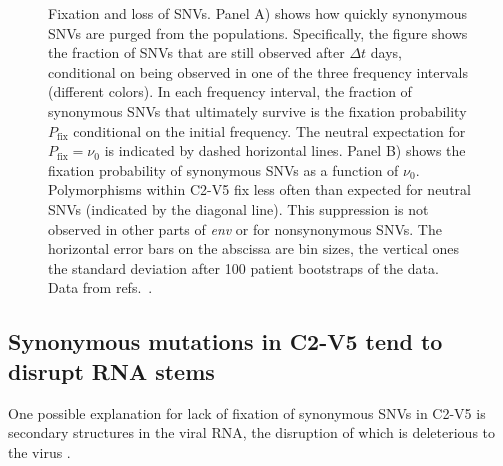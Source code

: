 \documentclass[rmp, twocolumn]{revtex4}
\newcommand{\pfix}{P_{\mathrm{fix}}}
\newcommand{\env}{\textit{env}}
\newcommand{\shankaregion}{C2-V5}
\begin{document}
\begin{figure}
\begin{center}
{\label{fig:fixp2}}
\caption{Fixation and loss of SNVs.
Panel A) shows how quickly synonymous SNVs are purged from the populations. 
Specifically, the figure shows the fraction of SNVs that are still observed
after $\Delta t$ days, conditional on being observed in one of the three frequency 
intervals (different colors). 
In each frequency interval, the fraction of synonymous
SNVs that ultimately survive is the fixation probability $\pfix$ conditional on the
initial frequency. The neutral expectation for $\pfix=\nu_0$ is indicated by 
dashed horizontal lines.
Panel B) shows the fixation probability of synonymous SNVs as a function of $\nu_0$. Polymorphisms within \shankaregion{} fix less
often than expected for neutral SNVs (indicated by the diagonal line).
This suppression is not observed in other parts of \env{} or for nonsynonymous
SNVs.
The horizontal error bars on the abscissa are bin sizes, the vertical ones the
standard deviation after 100 patient bootstraps of the data. Data from
refs.~\cite{shankarappa_consistent_1999,liu_selection_2006, bunnik_autologous_2008}.}
\label{fig:fixp}
\end{center}
\end{figure}

\subsection*{Synonymous mutations in \shankaregion{} tend to disrupt RNA stems}
One possible explanation for lack of fixation of synonymous SNVs in
\shankaregion{} is secondary structures in the viral RNA, the disruption of which
is deleterious to the virus \citep{forsdyke_reciprocal_1995,
snoeck_mapping_2011, sanjuan_interplay_2011}.
\end{document}
